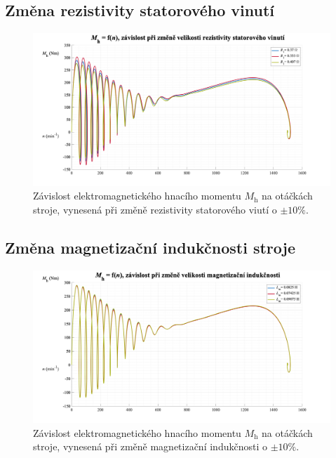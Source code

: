 \documentclass[a4paper, twoside, 11pt]{article}
\newcommand{\fbar}{\FloatBarrier}
\begin{document}
    \subsection{Změna rezistivity statorového vinutí}
        \begin{figure}[htbp!]
            \centering
            \includegraphics[width=1\textwidth]{src/png/mh_dyn_nGraphR1.png}
            \caption{Závislost elektromagnetického hnacího momentu $M_\text{h}$ na otáčkách stroje, vynesená při změně rezistivity statorového viutí o $\pm 10 \%$.}
            \label{fig:mh_dyn_nGraphR1}
        \end{figure}

    \fbar
    \subsection{Změna magnetizační indukčnosti stroje}
        \begin{figure}[htbp!]
            \centering
            \includegraphics[width=1\textwidth]{src/png/mh_dyn_nGraphLm.png}
            \caption{Závislost elektromagnetického hnacího momentu $M_\text{h}$ na otáčkách stroje, vynesená při změně magnetizační indukčnosti o $\pm 10 \%$.}
            \label{fig:mh_dyn_nGraphLm}
        \end{figure}
\end{document}
